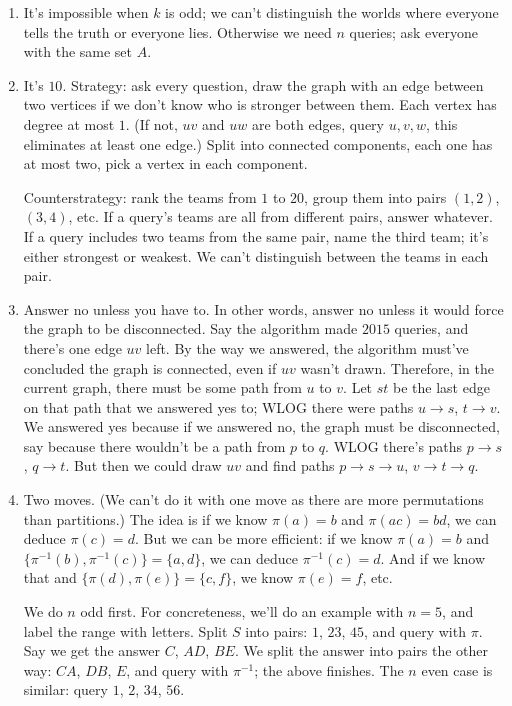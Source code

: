 \documentclass[11pt,paper=letter]{scrartcl}
\begin{document}
\begin{enumerate}
\item It's impossible when $k$ is odd; we can't distinguish the worlds where everyone tells the truth or everyone lies. Otherwise we need $n$ queries; ask everyone with the same set $A$.

\item It's $10$. Strategy: ask every question, draw the graph with an edge between two vertices if we don't know who is stronger between them. Each vertex has degree at most $1$. (If not, $uv$ and $uw$ are both edges, query $u, v, w$, this eliminates at least one edge.) Split into connected components, each one has at most two, pick a vertex in each component.

Counterstrategy: rank the teams from $1$ to $20$, group them into pairs $(1, 2)$, $(3, 4)$, etc. If a query's teams are all from different pairs, answer whatever. If a query includes two teams from the same pair, name the third team; it's either strongest or weakest. We can't distinguish between the teams in each pair.

\item Answer no unless you have to. In other words, answer no unless it would force the graph to be disconnected. Say the algorithm made $2015$ queries, and there's one edge $uv$ left. By the way we answered, the algorithm must've concluded the graph is connected, even if $uv$ wasn't drawn. Therefore, in the current graph, there must be some path from $u$ to $v$. Let $st$ be the last edge on that path that we answered yes to; WLOG there were paths $u \to s$, $t \to v$. We answered yes because if we answered no, the graph must be disconnected, say because there wouldn't be a path from $p$ to $q$. WLOG there's paths $p\to s$, $q\to t$. But then we could draw $uv$ and find paths $p \to s \to u$, $v \to t \to q$.

\item Two moves. (We can't do it with one move as there are more permutations than partitions.) The idea is if we know $\pi(a) = b$ and $\pi(ac) = bd$, we can deduce $\pi(c) = d$. But we can be more efficient: if we know $\pi(a) = b$ and $\{\pi^{-1}(b), \pi^{-1}(c)\} = \{a, d\}$, we can deduce $\pi^{-1}(c) = d$. And if we know that and $\{\pi(d), \pi(e)\} = \{c, f\}$, we know $\pi(e) = f$, etc.

We do $n$ odd first. For concreteness, we'll do an example with $n = 5$, and label the range with letters. Split $S$ into pairs: $1$, $23$, $45$, and query with $\pi$. Say we get the answer $C$, $AD$, $BE$. We split the answer into pairs the other way: $CA$, $DB$, $E$, and query with $\pi^{-1}$; the above finishes. The $n$ even case is similar: query $1$, $2$, $34$, $56$.


\end{enumerate}
\end{document}
